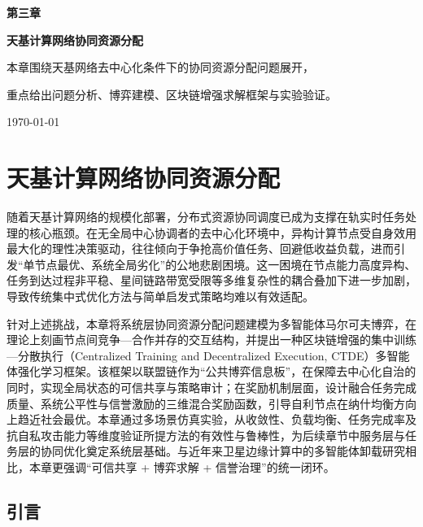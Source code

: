 \documentclass[UTF8,12pt,oneside]{ctexbook}
\begin{document}
\begin{titlepage}
\centering
\vspace*{4.2cm}
{\bfseries 第三章\par}
\vspace{1.0cm}
{\bfseries 天基计算网络协同资源分配\par}
\vspace{2.0cm}
{本章围绕天基网络去中心化条件下的协同资源分配问题展开，\par}
{重点给出问题分析、博弈建模、区块链增强求解框架与实验验证。\par}
\vfill
{\today\par}
\end{titlepage}

\frontmatter
\tableofcontents
\mainmatter
\setcounter{chapter}{2}

\chapter{天基计算网络协同资源分配}
\label{chap:ch3}

随着天基计算网络的规模化部署，分布式资源协同调度已成为支撑在轨实时任务处理的核心瓶颈。在无全局中心协调者的去中心化环境中，异构计算节点受自身效用最大化的理性决策驱动，往往倾向于争抢高价值任务、回避低收益负载，进而引发“单节点最优、系统全局劣化”的公地悲剧困境。这一困境在节点能力高度异构、任务到达过程非平稳、星间链路带宽受限等多维复杂性的耦合叠加下进一步加剧，导致传统集中式优化方法与简单启发式策略均难以有效适配。

针对上述挑战，本章将系统层协同资源分配问题建模为多智能体马尔可夫博弈，在理论上刻画节点间竞争—合作并存的交互结构，并提出一种区块链增强的集中训练—分散执行（Centralized Training and Decentralized Execution, CTDE）多智能体强化学习框架。该框架以联盟链作为“公共博弈信息板”，在保障去中心化自治的同时，实现全局状态的可信共享与策略审计；在奖励机制层面，设计融合任务完成质量、系统公平性与信誉激励的三维混合奖励函数，引导自利节点在纳什均衡方向上趋近社会最优。本章通过多场景仿真实验，从收敛性、负载均衡、任务完成率及抗自私攻击能力等维度验证所提方法的有效性与鲁棒性，为后续章节中服务层与任务层的协同优化奠定系统层基础。与近年来卫星边缘计算中的多智能体卸载研究相比，本章更强调“可信共享 + 博弈求解 + 信誉治理”的统一闭环\cite{ref1,ref2,ref3}。



\section{引言}
\end{document}

